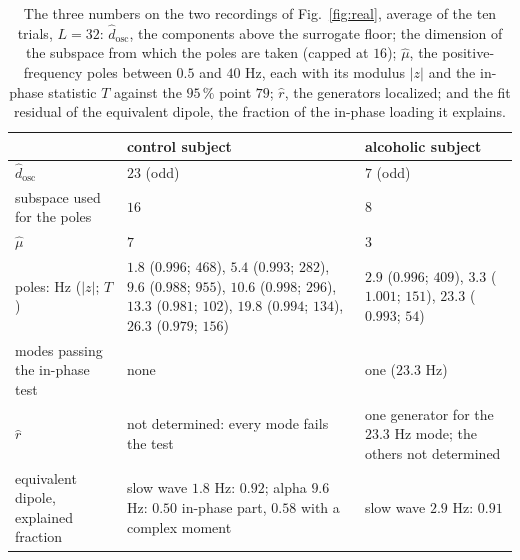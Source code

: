 \documentclass{article}
\begin{document}
\begin{table}[htb]
\centering
\caption{The three numbers on the two recordings of Fig.~\ref{fig:real}, average of the ten trials, $L = 32$: $\widehat{d}_{\mathrm{osc}}$, the components above the surrogate floor; the dimension of the subspace from which the poles are taken (capped at $16$); $\widehat{\mu}$, the positive-frequency poles between $0.5$ and $40$ Hz, each with its modulus $|z|$ and the in-phase statistic $T$ against the $95\,\%$ point $79$; $\widehat{r}$, the generators localized; and the fit residual of the equivalent dipole, the fraction of the in-phase loading it explains.}
\label{tab:three-numbers}
\small
\begin{tabular}{p{} p{} p{}}
\toprule
 & control subject & alcoholic subject \\
\midrule
$\widehat{d}_{\mathrm{osc}}$ & $23$ (odd) & $7$ (odd) \\
subspace used for the poles & $16$ & $8$ \\
$\widehat{\mu}$ & $7$ & $3$ \\
poles: Hz ($|z|$; $T$) & $1.8$ ($0.996$; $468$), $5.4$ ($0.993$; $282$), $9.6$ ($0.988$; $955$), $10.6$ ($0.998$; $296$), $13.3$ ($0.981$; $102$), $19.8$ ($0.994$; $134$), $26.3$ ($0.979$; $156$) & $2.9$ ($0.996$; $409$), $3.3$ ($1.001$; $151$), $23.3$ ($0.993$; $54$) \\
modes passing the in-phase test & none & one ($23.3$ Hz) \\
$\widehat{r}$ & not determined: every mode fails the test & one generator for the $23.3$ Hz mode; the others not determined \\
equivalent dipole, explained fraction & slow wave $1.8$ Hz: $0.92$; alpha $9.6$ Hz: $0.50$ in-phase part, $0.58$ with a complex moment & slow wave $2.9$ Hz: $0.91$ \\
\bottomrule
\end{tabular}
\end{table}
\end{document}
